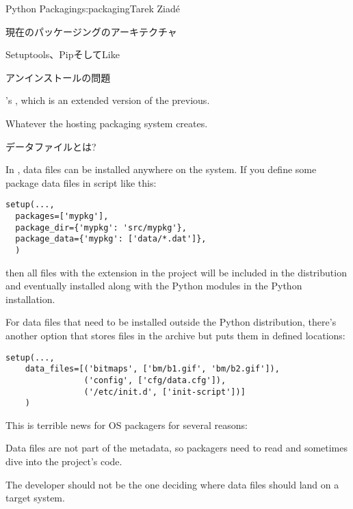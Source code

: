 \begin{aosachapter}{Python Packaging}{s:packaging}{Tarek Ziad\'{e}}
\begin{aosasect1}{現在のパッケージングのアーキテクチャ}
\begin{aosasect2}{Setuptools、PipそしてLike}
\begin{aosasect3}{アンインストールの問題}
\begin{aosaitemize}
  \item {}'s , which is an extended version of
  the previous.

  \item Whatever the hosting packaging system creates.

\end{aosaitemize}

\end{aosasect3}

\end{aosasect2}

\begin{aosasect2}{データファイルとは?}

In , data files can be installed anywhere on the
system.  If you define some package data files in 
script like this:

\begin{verbatim}
setup(...,
  packages=['mypkg'],
  package_dir={'mypkg': 'src/mypkg'},
  package_data={'mypkg': ['data/*.dat']},
  )
\end{verbatim}

\noindent then all files with the  extension in the 
project will be included in the distribution and eventually installed
along with the Python modules in the Python installation.

For data files that need to be installed outside the Python distribution, 
there's another option that stores files in the archive but puts them in defined
locations:

\begin{verbatim}
setup(...,
    data_files=[('bitmaps', ['bm/b1.gif', 'bm/b2.gif']),
                ('config', ['cfg/data.cfg']),
                ('/etc/init.d', ['init-script'])]
    )
\end{verbatim}

\noindent
This is terrible news for OS packagers for several reasons:

\begin{aosaitemize}

  \item Data files are not part of the metadata, so packagers need to read
   and sometimes dive into the project's code.

  \item The developer should not be the one deciding where data files
  should land on a target system.


\end{aosaitemize}
\end{aosasect2}
\end{aosasect1}
\end{aosachapter}
